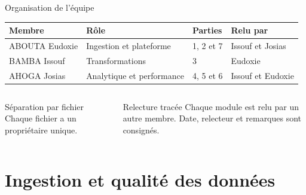 \documentclass[aspectratio=169,11pt]{beamer}
\begin{document}
\begin{frame}{Organisation de l'équipe}
  \vspace{1mm}
  \begin{center}
  \small
  \begin{tabular}{@{}l l l l@{}}
    \toprule
    \textbf{Membre} & \textbf{Rôle} & \textbf{Parties} & \textbf{Relu par} \\
    \midrule
    ABOUTA Eudoxie & Ingestion et plateforme   & 1, 2 et 7 & Issouf et Josias \\
    BAMBA Issouf   & Transformations           & 3         & Eudoxie \\
    AHOGA Josias   & Analytique et performance & 4, 5 et 6 & Issouf et Eudoxie \\
    \bottomrule
  \end{tabular}
  \end{center}

  \vspace{5mm}
  \begin{columns}[t,onlytextwidth]
      \begin{block}{Séparation par fichier}
        \footnotesize Chaque fichier a un propriétaire unique.
      \end{block}
      \begin{block}{Relecture tracée}
        \footnotesize Chaque module est relu par un autre membre.
        Date, relecteur et remarques sont consignés.
      \end{block}
  \end{columns}

\end{frame}

\section{Ingestion et qualité des données}
\end{document}
